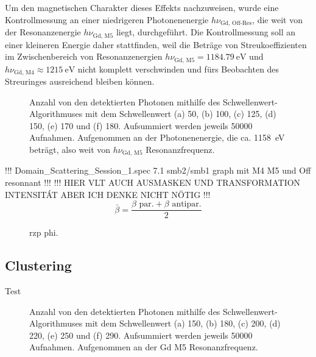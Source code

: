 \noindent
Um den magnetischen Charakter dieses Effekts nachzuweisen, wurde eine Kontrollmessung an einer niedrigeren Photonenenergie $h\nu_{\text{Gd, Off-Res}}$, die weit von der Resonanzenergie $h\nu_{\text{Gd, M5}}$ liegt, durchgeführt. Die Kontrollmessung soll an einer kleineren Energie daher stattfinden, weil die Beträge von Streukoeffizienten im Zwischenbereich von Resonanzenergien $h\nu_{\text{Gd, M5}} = \SI{1184,79}{\eV}$ und $h\nu_{\text{Gd, M4}} \approx \SI{1215}{\eV}$ nicht komplett verschwinden und fürs Beobachten des Streuringes ausreichend bleiben können.

\begin{figure}[H]
    \centering
    
    \caption{Anzahl von den detektierten Photonen mithilfe des Schwellenwert-Algorithmuses mit dem Schwellenwert (a) \SI{50}{\adu}, (b) \SI{100}{\adu}, (c) \SI{125}{\adu}, (d) \SI{150}{\adu}, (e) \SI{170}{\adu} und (f) \SI{180}{\adu}. Aufsummiert werden jeweils \num{50000} Aufnahmen. Aufgenommen an der Photonenenergie, die ca. \SI{1158}{\eV} beträgt, also weit von $h\nu_\text{Gd, M5}$ Resonanzfrequenz.}
    \label{fig:th_50_100_125_150_170_180_off_resonance}
\end{figure}
!!! Domain\_Scattering\_Session\_1.spec 7.1 smb2/smb1 graph mit M4 M5 und Off resonnant !!! 
!!! HIER VLT AUCH AUSMASKEN UND TRANSFORMATION INTENSITÁT ABER ICH DENKE NICHT NÖTIG !!!
\begin{equation}
    \bar{\beta} = \frac{\beta \text{ par.} + \beta \text{ antipar.}}{2}
\end{equation}

\begin{figure}[H]
    \centering
    
    \caption{rzp phi.}
    \label{fig:rzp_phi_ev}
\end{figure}


\subsection{Clustering}
\noindent
Test
\begin{figure}[H]
    \centering
    
    \caption{Anzahl von den detektierten Photonen mithilfe des Schwellenwert-Algorithmuses mit dem Schwellenwert (a) \SI{150}{\adu}, (b) \SI{180}{\adu}, (c) \SI{200}{\adu}, (d) \SI{220}{\adu}, (e) \SI{250}{\adu} und (f) \SI{290}{\adu}. Aufsummiert werden jeweils \num{50000} Aufnahmen. Aufgenommen an der Gd M5 Resonanzfrequenz.}
    \label{fig:cl_2_0_100_125_150_170_180_resonance}
\end{figure}

